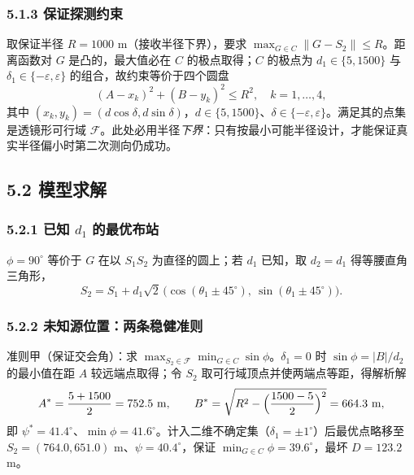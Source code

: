 \documentclass[UTF8, zihao=5,AutoFakeBold=2]{ctexart}
\begin{document}
		\subsubsection*{5.1.3 保证探测约束}
		取保证半径 \(R=1000\) m（接收半径下界），要求 \(\max_{G\in C}\lVert G-S_2\rVert\le R\)。距离函数对 \(G\) 是凸的，最大值必在 \(C\) 的极点取得；\(C\) 的极点为 \(d_1\in\{5,1500\}\) 与 \(\delta_1\in\{-\varepsilon,\varepsilon\}\) 的组合，故约束等价于四个圆盘
		\begin{equation}
			(A-x_k)^2+(B-y_k)^2\le R^2,\quad k=1,\dots,4,
			\label{eq:lens}
		\end{equation}
		其中 \((x_k,y_k)=(d\cos\delta,d\sin\delta)\)，\(d\in\{5,1500\}\)、\(\delta\in\{-\varepsilon,\varepsilon\}\)。满足其的点集是透镜形可行域 \(\mathcal F\)。此处必用半径\emph{下界}：只有按最小可能半径设计，才能保证真实半径偏小时第二次测向仍成功。

	\subsection*{5.2 模型求解}
		\subsubsection*{5.2.1 已知 \(d_1\) 的最优布站}
		\(\phi=90^\circ\) 等价于 \(G\) 在以 \(S_1S_2\) 为直径的圆上；若 \(d_1\) 已知，取 \(d_2=d_1\) 得等腰直角三角形，
		\begin{equation}
			S_2=S_1+d_1\sqrt2\,\bigl(\cos(\theta_1\pm45^\circ),\ \sin(\theta_1\pm45^\circ)\bigr).
			\label{eq:known}
		\end{equation}

		\subsubsection*{5.2.2 未知源位置：两条稳健准则}
		准则甲（保证交会角）：求 \(\max_{S_2\in\mathcal F}\min_{G\in C}\sin\phi\)。\(\delta_1=0\) 时 \(\sin\phi=|B|/d_2\) 的最小值在距 \(A\) 较远端点取得；令 \(S_2\) 取可行域顶点并使两端点等距，得解析解
		\begin{equation}
			A^\ast=\frac{5+1500}{2}=752.5\ \text{m},\qquad
			B^\ast=\sqrt{R^2-\Bigl(\frac{1500-5}{2}\Bigr)^2}=664.3\ \text{m},
			\label{eq:criterionA}
		\end{equation}
		即 \(\psi^\ast=41.4^\circ\)、\(\min\phi=41.6^\circ\)。计入二维不确定集（\(\delta_1=\pm1^\circ\)）后最优点略移至 \(S_2=(764.0,651.0)\) m、\(\psi=40.4^\circ\)，保证 \(\min_{G\in C}\phi=39.6^\circ\)，最坏 \(D=123.2\) m。
\end{document}
